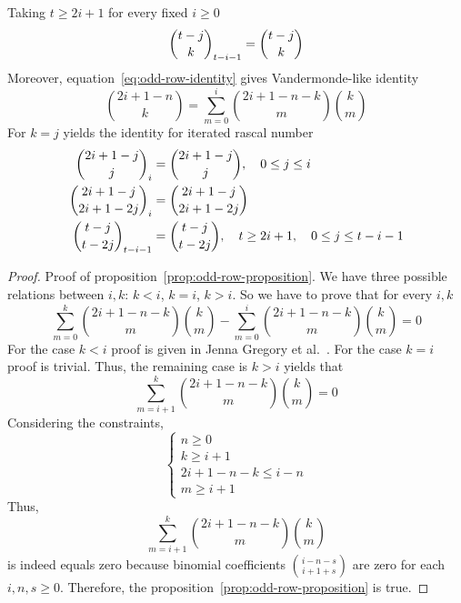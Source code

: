 Taking $t \geq 2i+1$ for every fixed $i \geq 0$
\begin{align*}
    \binom{t-j}{k}_{t-i-1}= \binom{t-j}{k}
\end{align*}
Moreover, equation~\eqref{eq:odd-row-identity} gives Vandermonde-like identity
\begin{equation*}
    \binom{2i+1-n}{k} = \sum_{m=0}^{i} \binom{2i+1-n-k}{m} \binom{k}{m}
\end{equation*}
For $k=j$ yields the identity for iterated rascal number
\begin{align*}
    \binom{2i+1-j}{j}_{i}         &= \binom{2i+1-j}{j}, \quad 0 \leq j \leq i \\
    \binom{2i+1-j}{2i+1-2j}_{i}   &= \binom{2i+1-j}{2i+1-2j} \\
    \binom{t-j}{t-2j}_{t-i-1}     &= \binom{t-j}{t-2j}, \quad t \geq 2i+1, \quad 0 \leq j \leq t-i-1
\end{align*}
\begin{proof}
    Proof of proposition~\ref{prop:odd-row-proposition}.
    We have three possible relations between $i,k$: $k<i$, $k=i$, $k > i$.
    So we have to prove that for every $i,k$
    \begin{equation*}
        \sum_{m=0}^{k} \binom{2i+1-n-k}{m} \binom{k}{m} - \sum_{m=0}^{i} \binom{2i+1-n-k}{m} \binom{k}{m} = 0
    \end{equation*}
    For the case $k<i$ proof is given in Jenna Gregory et al.~\cite{gregory2023iterated}.
    For the case $k=i$ proof is trivial.
    Thus, the remaining case is $k>i$ yields that
    \begin{equation*}
        \sum_{m=i+1}^{k} \binom{2i+1-n-k}{m} \binom{k}{m} = 0
    \end{equation*}
    Considering the constraints,
    \begin{equation*}
        \begin{cases}
            n \geq 0 \\
            k \geq i+1 \\
            2i+1-n-k \leq i-n \\
            m \geq i+1
        \end{cases}
    \end{equation*}
    Thus,
    \begin{equation*}
        \sum_{m=i+1}^{k} \binom{2i+1-n-k}{m} \binom{k}{m}
    \end{equation*}
    is indeed equals zero because binomial coefficients $\binom{i-n-s}{i+1+s}$ are zero for each $i, n, s \geq 0$.
    Therefore, the proposition~\eqref{prop:odd-row-proposition} is true.
\end{proof}
